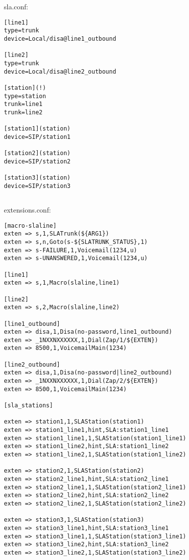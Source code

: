 sla.conf:
\begin{astlisting}
\begin{verbatim}
[line1]
type=trunk
device=Local/disa@line1_outbound

[line2]
type=trunk
device=Local/disa@line2_outbound

[station](!)
type=station
trunk=line1
trunk=line2

[station1](station)
device=SIP/station1

[station2](station)
device=SIP/station2

[station3](station)
device=SIP/station3
	
\end{verbatim}
\end{astlisting}

extensions.conf:
\begin{astlisting}
\begin{verbatim}
[macro-slaline]
exten => s,1,SLATrunk(${ARG1})
exten => s,n,Goto(s-${SLATRUNK_STATUS},1)
exten => s-FAILURE,1,Voicemail(1234,u)
exten => s-UNANSWERED,1,Voicemail(1234,u)

[line1]
exten => s,1,Macro(slaline,line1)

[line2]
exten => s,2,Macro(slaline,line2)

[line1_outbound]
exten => disa,1,Disa(no-password,line1_outbound)
exten => _1NXXNXXXXXX,1,Dial(Zap/1/${EXTEN})
exten => 8500,1,VoicemailMain(1234)

[line2_outbound]
exten => disa,1,Disa(no-password|line2_outbound)
exten => _1NXXNXXXXXX,1,Dial(Zap/2/${EXTEN})
exten => 8500,1,VoicemailMain(1234)

[sla_stations]

exten => station1,1,SLAStation(station1)
exten => station1_line1,hint,SLA:station1_line1
exten => station1_line1,1,SLAStation(station1_line1)
exten => station1_line2,hint,SLA:station1_line2
exten => station1_line2,1,SLAStation(station1_line2)

exten => station2,1,SLAStation(station2)
exten => station2_line1,hint,SLA:station2_line1
exten => station2_line1,1,SLAStation(station2_line1)
exten => station2_line2,hint,SLA:station2_line2
exten => station2_line2,1,SLAStation(station2_line2)

exten => station3,1,SLAStation(station3)
exten => station3_line1,hint,SLA:station3_line1
exten => station3_line1,1,SLAStation(station3_line1)
exten => station3_line2,hint,SLA:station3_line2
exten => station3_line2,1,SLAStation(station3_line2)
	
\end{verbatim}
\end{astlisting}

